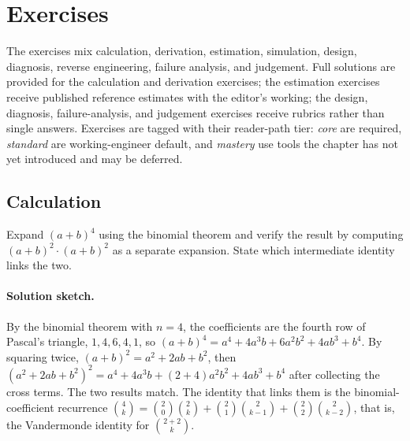 \section{Exercises}

The exercises mix calculation, derivation, estimation, simulation,
design, diagnosis, reverse engineering, failure analysis, and
judgement. Full
solutions are provided for the calculation and derivation exercises;
the estimation exercises receive published reference estimates with
the editor's working; the design, diagnosis, failure-analysis, and
judgement exercises receive rubrics rather than single answers.
Exercises are tagged with their reader-path tier: \emph{core} are
required, \emph{standard} are working-engineer default, and
\emph{mastery} use tools the chapter has not yet introduced and may
be deferred.

\subsection*{Calculation}

\begin{exercise}
Expand $(a + b)^{4}$ using the binomial theorem and verify the
result by computing $(a+b)^{2} \cdot (a+b)^{2}$ as a separate
expansion. State which intermediate identity links the two.

\paragraph{Solution sketch.}
By the binomial theorem with $n = 4$, the coefficients are the
fourth row of Pascal's triangle, $1, 4, 6, 4, 1$, so
$(a+b)^{4} = a^{4} + 4 a^{3} b + 6 a^{2} b^{2} + 4 a b^{3} + b^{4}$.
By squaring twice, $(a+b)^{2} = a^{2} + 2ab + b^{2}$, then
$(a^{2} + 2ab + b^{2})^{2} = a^{4} + 4 a^{3} b + (2 + 4) a^{2} b^{2}
+ 4 a b^{3} + b^{4}$ after collecting the cross terms. The two
results match. The identity that links them is the binomial-
coefficient recurrence $\binom{4}{k} = \binom{2}{0}\binom{2}{k} +
\binom{2}{1}\binom{2}{k-1} + \binom{2}{2}\binom{2}{k-2}$, that is,
the Vandermonde identity for $\binom{2+2}{k}$.
\end{exercise}

